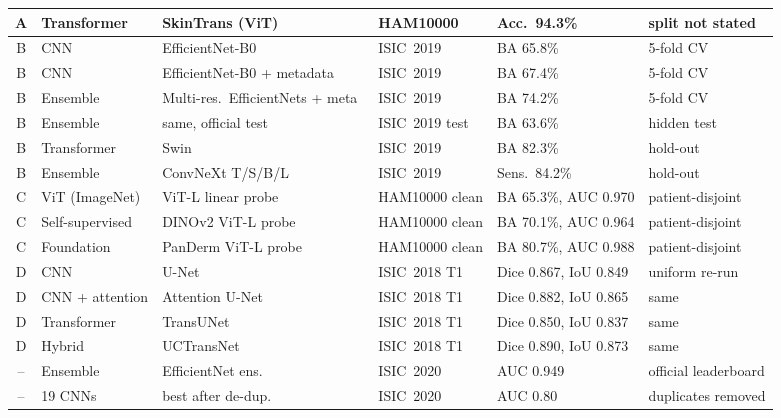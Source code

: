 \documentclass[10pt,a4paper]{article}
\begin{document}
{\begin{longtable}{@{}c L{2.1cm} L{3.6cm} L{2.4cm} L{3.1cm} L{3.0cm}@{}}
A & Transformer & SkinTrans (ViT)~\cite{xin2022skintrans} & HAM10000 & Acc.\ 94.3\% & split not stated \\
\midrule
B & CNN & EfficientNet-B0~\cite{gessert2020} & ISIC~2019 & BA 65.8\% & 5-fold CV \\
B & CNN & EfficientNet-B0 + metadata~\cite{gessert2020} & ISIC~2019 & BA 67.4\% & 5-fold CV \\
B & Ensemble & Multi-res.\ EfficientNets + meta~\cite{gessert2020} & ISIC~2019 & BA 74.2\% & 5-fold CV \\
B & Ensemble & same, official test~\cite{gessert2020} & ISIC~2019 test & BA 63.6\% & hidden test \\
B & Transformer & Swin~\cite{ayas2023swin} & ISIC~2019 & BA 82.3\% & hold-out \\
B & Ensemble & ConvNeXt T/S/B/L~\cite{baykal2024convnext} & ISIC~2019 & Sens.\ 84.2\% & hold-out \\
\midrule
C & ViT (ImageNet) & ViT-L linear probe~\cite{yan2025panderm} & HAM10000 clean & BA 65.3\%, AUC 0.970 & patient-disjoint \\
C & Self-supervised & DINOv2 ViT-L probe~\cite{yan2025panderm} & HAM10000 clean & BA 70.1\%, AUC 0.964 & patient-disjoint \\
C & Foundation & PanDerm ViT-L probe~\cite{yan2025panderm} & HAM10000 clean & BA 80.7\%, AUC 0.988 & patient-disjoint \\
\midrule
D & CNN & U-Net~\cite{azad2024unet} & ISIC~2018 T1 & Dice 0.867, IoU 0.849 & uniform re-run \\
D & CNN + attention & Attention U-Net~\cite{azad2024unet} & ISIC~2018 T1 & Dice 0.882, IoU 0.865 & same \\
D & Transformer & TransUNet~\cite{azad2024unet} & ISIC~2018 T1 & Dice 0.850, IoU 0.837 & same \\
D & Hybrid & UCTransNet~\cite{azad2024unet} & ISIC~2018 T1 & Dice 0.890, IoU 0.873 & same \\
\midrule
-- & Ensemble & EfficientNet ens.~\cite{ha2020siim} & ISIC~2020 & AUC 0.949 & official leaderboard \\
-- & 19 CNNs & best after de-dup.~\cite{cassidy2022isic} & ISIC~2020 & AUC 0.80 & duplicates removed \\
\bottomrule
\end{longtable}
}
\end{document}
